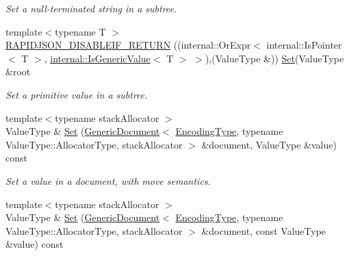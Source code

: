 \begin{DoxyCompactItemize}
\begin{DoxyCompactList}\small\item\em Set a null-\/terminated string in a subtree. \end{DoxyCompactList}\item 
{\footnotesize template$<$typename T $>$ }\\\hyperlink{class_generic_pointer_a914bbdd96e2a248e035b8ebd68526369}{R\+A\+P\+I\+D\+J\+S\+O\+N\+\_\+\+D\+I\+S\+A\+B\+L\+E\+I\+F\+\_\+\+R\+E\+T\+U\+RN} ((internal\+::\+Or\+Expr$<$ internal\+::\+Is\+Pointer$<$ T $>$, \hyperlink{structinternal_1_1_is_generic_value}{internal\+::\+Is\+Generic\+Value}$<$ T $>$ $>$),(Value\+Type \&)) \hyperlink{class_generic_pointer_adf0aa776e072b41d301e2a834ac2c2b5}{Set}(Value\+Type \&root
\begin{DoxyCompactList}\small\item\em Set a primitive value in a subtree. \end{DoxyCompactList}\item 
{\footnotesize template$<$typename stack\+Allocator $>$ }\\Value\+Type \& \hyperlink{class_generic_pointer_a49e879bd98bddbe7300f152a070d5604}{Set} (\hyperlink{class_generic_document}{Generic\+Document}$<$ \hyperlink{class_generic_pointer_a4b802da797a7a0b615fd9611cedb7c3b}{Encoding\+Type}, typename Value\+Type\+::\+Allocator\+Type, stack\+Allocator $>$ \&document, Value\+Type \&value) const \hypertarget{class_generic_pointer_a49e879bd98bddbe7300f152a070d5604}{}\label{class_generic_pointer_a49e879bd98bddbe7300f152a070d5604}

\begin{DoxyCompactList}\small\item\em Set a value in a document, with move semantics. \end{DoxyCompactList}\item 
{\footnotesize template$<$typename stack\+Allocator $>$ }\\Value\+Type \& \hyperlink{class_generic_pointer_afa59f450284e5cc6f989dab4b8344168}{Set} (\hyperlink{class_generic_document}{Generic\+Document}$<$ \hyperlink{class_generic_pointer_a4b802da797a7a0b615fd9611cedb7c3b}{Encoding\+Type}, typename Value\+Type\+::\+Allocator\+Type, stack\+Allocator $>$ \&document, const Value\+Type \&value) const \hypertarget{class_generic_pointer_afa59f450284e5cc6f989dab4b8344168}{}\label{class_generic_pointer_afa59f450284e5cc6f989dab4b8344168}


\end{DoxyCompactItemize}
